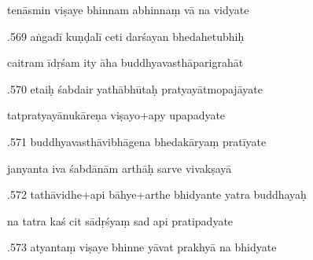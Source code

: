 \documentclass[article,12pt,a4paper]{memoir}%
\newcounter{parCount}
\begin{document}
	  
	  \pstart \leavevmode%
	tenāsmin viṣaye bhinnam abhinnaṃ vā na vidyate 
	{}
	\pend%
      

	  
	  \pstart {}.569 aṅgadī kuṇḍalī ceti darśayan bhedahetubhiḥ 
	{}
	\pend%
      

	  
	  \pstart \leavevmode%
	caitram īdṛśam ity āha buddhyavasthāparigrahāt 
	{}
	\pend%
      

	  
	  \pstart {}.570 etaiḥ śabdair yathābhūtaḥ   pratyayātmopajāyate 
	{}
	\pend%
      

	  
	  \pstart \leavevmode%
	tatpratyayānukāreṇa viṣayo+apy upapadyate 
	{}
	\pend%
      

	  
	  \pstart {}.571 buddhyavasthāvibhāgena bhedakāryaṃ pratīyate 
	{}
	\pend%
      

	  
	  \pstart \leavevmode%
	janyanta iva śabdānām arthāḥ sarve vivakṣayā 
	{}
	\pend%
      

	  
	  \pstart {}.572 tathāvidhe+api bāhye+arthe bhidyante yatra buddhayaḥ 
	{}
	\pend%
      

	  
	  \pstart \leavevmode%
	na tatra kaś cit sādṛśyaṃ sad api pratipadyate 
	{}
	\pend%
      

	  
	  \pstart {}.573 atyantaṃ viṣaye bhinne yāvat prakhyā na bhidyate 
	{}
	\pend%
      
\end{document}
